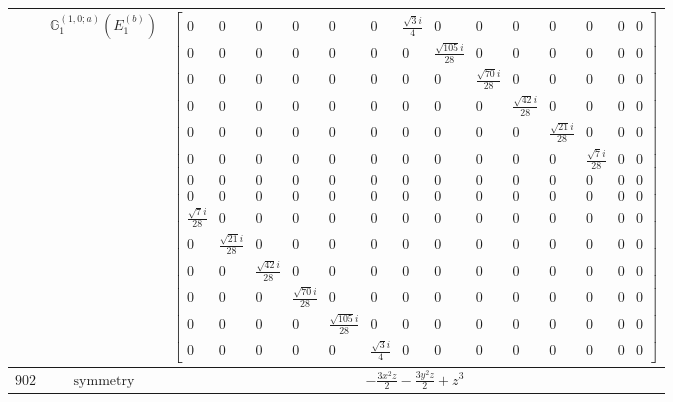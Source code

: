 \documentclass[fleqn,8pt,landscape]{jsarticle}
\begin{document}
\begin{longtable}{ccc}
$  $ & $ \mathbb{G}_{1}^{(1,0;a)}(E_{1}^{(b)}) $ & $ \begin{bmatrix} 0 & 0 & 0 & 0 & 0 & 0 & \frac{\sqrt{3} i}{4} & 0 & 0 & 0 & 0 & 0 & 0 & 0 \\ 0 & 0 & 0 & 0 & 0 & 0 & 0 & \frac{\sqrt{105} i}{28} & 0 & 0 & 0 & 0 & 0 & 0 \\ 0 & 0 & 0 & 0 & 0 & 0 & 0 & 0 & \frac{\sqrt{70} i}{28} & 0 & 0 & 0 & 0 & 0 \\ 0 & 0 & 0 & 0 & 0 & 0 & 0 & 0 & 0 & \frac{\sqrt{42} i}{28} & 0 & 0 & 0 & 0 \\ 0 & 0 & 0 & 0 & 0 & 0 & 0 & 0 & 0 & 0 & \frac{\sqrt{21} i}{28} & 0 & 0 & 0 \\ 0 & 0 & 0 & 0 & 0 & 0 & 0 & 0 & 0 & 0 & 0 & \frac{\sqrt{7} i}{28} & 0 & 0 \\ 0 & 0 & 0 & 0 & 0 & 0 & 0 & 0 & 0 & 0 & 0 & 0 & 0 & 0 \\ 0 & 0 & 0 & 0 & 0 & 0 & 0 & 0 & 0 & 0 & 0 & 0 & 0 & 0 \\ \frac{\sqrt{7} i}{28} & 0 & 0 & 0 & 0 & 0 & 0 & 0 & 0 & 0 & 0 & 0 & 0 & 0 \\ 0 & \frac{\sqrt{21} i}{28} & 0 & 0 & 0 & 0 & 0 & 0 & 0 & 0 & 0 & 0 & 0 & 0 \\ 0 & 0 & \frac{\sqrt{42} i}{28} & 0 & 0 & 0 & 0 & 0 & 0 & 0 & 0 & 0 & 0 & 0 \\ 0 & 0 & 0 & \frac{\sqrt{70} i}{28} & 0 & 0 & 0 & 0 & 0 & 0 & 0 & 0 & 0 & 0 \\ 0 & 0 & 0 & 0 & \frac{\sqrt{105} i}{28} & 0 & 0 & 0 & 0 & 0 & 0 & 0 & 0 & 0 \\ 0 & 0 & 0 & 0 & 0 & \frac{\sqrt{3} i}{4} & 0 & 0 & 0 & 0 & 0 & 0 & 0 & 0 \end{bmatrix} $ \\ \hline
$ 902 $ & $ \text{symmetry} $ & $ - \frac{3 x^{2} z}{2} - \frac{3 y^{2} z}{2} + z^{3} $ \\

\end{longtable}
\end{document}
